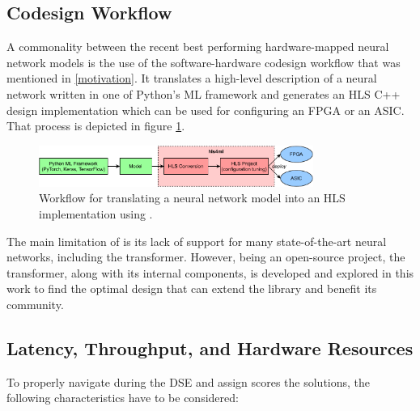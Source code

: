 \subsection{\hlsml Codesign Workflow}
A commonality between the recent best performing hardware-mapped neural network models is the use of the \hlsml software-hardware codesign workflow that was mentioned in \cref{motivation}. It translates a high-level description of a neural network written in one of Python's ML framework and generates an HLS C++ design implementation which can be used for configuring an FPGA or an ASIC. That process is depicted in figure \ref{fig:hls4ml-flow}.

\begin{figure}[hpt!]
  \centering
  \includegraphics[trim={0cm 0cm 0cm 0cm}, width=0.8\textwidth, center]{background/hls4ml_flow_better.pdf}
  \caption{Workflow for translating a neural network model into an HLS implementation using \hlsml.}
  \label{fig:hls4ml-flow}
\end{figure}

The main limitation of \hlsml is its lack of support for many state-of-the-art neural networks, including the transformer. However, being an open-source project, the transformer, along with its internal components, is developed and explored in this work to find the optimal design that can extend the library and benefit its community.

\subsection{Latency, Throughput, and Hardware Resources}\label{latency-throughput-resources}
To properly navigate during the DSE and assign scores the solutions, the following characteristics have to be considered:

